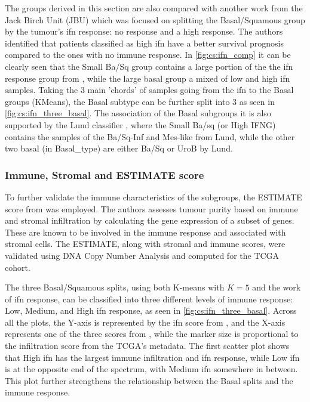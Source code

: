 The groups derived in this section are also compared with another work \citet{Baker2022-bj} from the Jack Birch Unit (JBU) which was focused on splitting the Basal/Squamous group by the tumour's \acrfull{ifn} response: no response and a high response. The authors identified that patients classified as high \acrshort{ifn} have a better survival prognosis compared to the ones with no immune response. In \cref{fig:cs:ifn_comp} it can be clearly seen that the Small Ba/Sq group contains a large portion of the the \acrshort{ifn} response group from \citet{Baker2022-bj}, while the large basal group a mixed of low and high \acrshort{ifn} samples. Taking the 3 main 'chords' of samples going from the \acrshort{ifn} to the Basal groups (KMeans), the Basal subtype can be further split into 3 as seen in \cref{fig:cs:ifn_three_basal}. The association of the Basal subgroups it is also supported by the Lund classifier \citet{Marzouka2018-ge}, where the Small Ba/sq (or High IFNG) contains the samples of the Ba/Sq-Inf and Mes-like from Lund, while the other two basal (in Basal\_type) are either Ba/Sq or UroB by Lund.

\subsubsection{Immune, Stromal and ESTIMATE score}

To further validate the immune characteristics of the subgroups, the ESTIMATE score from \citet{Yoshihara2013-wq} was employed. The authors assesses tumour purity based on immune and stromal infiltration by calculating the gene expression of a subset of genes. These are known to be involved in the immune response and associated with stromal cells. The ESTIMATE, along with stromal and immune scores, were validated using DNA Copy Number Analysis and computed for the TCGA cohort.

The three Basal/Squamous splits, using both K-means with \( K = 5 \) and the work of \acrshort{ifn} response, can be classified into three different levels of immune response: Low, Medium, and High \acrshort{ifn} response, as seen in \cref{fig:cs:ifn_three_basal}. Across all the plots, the Y-axis is represented by the \acrshort{ifn} score from \citet{Baker2022-bj}, and the X-axis represents one of the three scores from \citet{Yoshihara2013-wq}, while the marker size is proportional to the infiltration score from the TCGA's metadata. The first scatter plot shows that High \acrshort{ifn} has the largest immune infiltration and \acrshort{ifn} response, while Low \acrshort{ifn} is at the opposite end of the spectrum, with Medium \acrshort{ifn} somewhere in between. This plot further strengthens the relationship between the Basal splits and the immune response.

